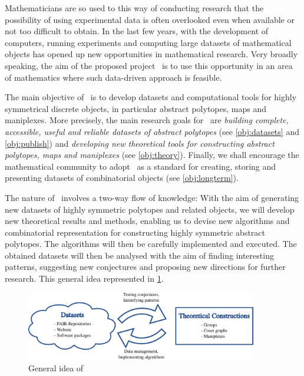 Mathematicians are so used to this way of conducting research that the possibility of using experimental data is often overlooked even when available or not too difficult to obtain.
In the last few years, with the development of computers, running experiments and computing large datasets of mathematical objects has opened up new opportunities in mathematical research.
Very broadly speaking, the aim of the proposed project \ourp\ is to use this opportunity in an area of mathematics where such data-driven approach is feasible.



The  main objective of \ourp\ is to develop datasets and computational tools for highly symmetrical discrete objects, in particular abstract polytopes, maps and maniplexes.
More precisely, the main research goals for \ourp\ are \emph{building complete, accessible, useful and reliable datasets of abstract polytopes} (see \cref{obj:datasets} and \cref{obj:publish}) and \emph{developing new theoretical tools for constructing abstract polytopes, maps and maniplexes} (see \cref{obj:theory}).
Finally, we shall encourage the mathematical community to adopt \ourp\ as a standard for creating, storing and presenting datasets of combinatorial objects (see \cref{obj:longterm}).

The nature of \ourp\ involves a two-way flow of knowledge:
With the aim of generating new datasets of highly symmetric polytopes and related objects, we will develop new theoretical results and methods, enabling us to devise new algorithms and combinatorial representation for constructing highly symmetric abstract polytopes.
The algorithms will then be carefully implemented and executed.
The obtained datasets will then be analysed with the aim of finding interesting patterns, suggesting new conjectures and proposing new directions for further research. This general idea represented in \cref{fig:idea}.

\begin{figure}[hbt]
\centering
  \includegraphics[width=0.9\textwidth]{source/overall}
  \caption{General idea of \ourp\ }\label{fig:idea}
\end{figure}



